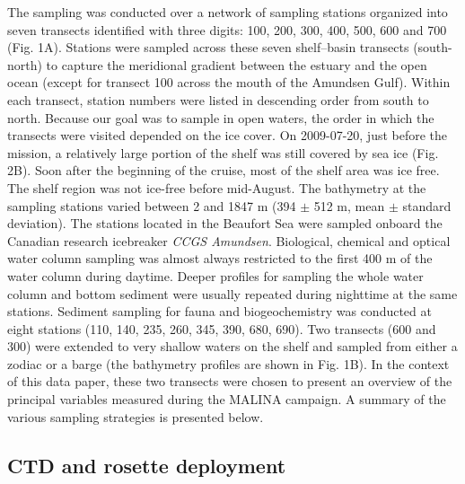 \documentclass[essd, manuscript]{copernicus}
\begin{document}
The sampling was conducted over a network of sampling stations organized into seven transects identified with three digits: 100, 200, 300, 400, 500, 600 and 700 (Fig. 1A). Stations were sampled across these seven shelf–basin transects (south-north) to capture the meridional gradient between the estuary and the open ocean (except for transect 100 across the mouth of the Amundsen Gulf). Within each transect, station numbers were listed in descending order from south to north. Because our goal was to sample in open waters, the order in which the transects were visited depended on the ice cover. On 2009-07-20, just before the mission, a relatively large portion of the shelf was still covered by sea ice (Fig. 2B). Soon after the beginning of the cruise, most of the shelf area was ice free. The shelf region was not ice-free before mid-August. The bathymetry at the sampling stations varied between 2 and 1847 m (394 $\pm$ 512 m, mean $\pm$ standard deviation). The stations located in the Beaufort Sea were sampled onboard the Canadian research icebreaker \textit{CCGS Amundsen}. Biological, chemical and optical water column sampling was almost always restricted to the first 400 m of the water column during daytime. Deeper profiles for sampling the whole water column and bottom sediment were usually repeated during nighttime at the same stations. Sediment sampling for fauna and biogeochemistry was conducted at eight stations (110, 140, 235, 260, 345, 390, 680, 690). Two transects (600 and 300) were extended to very shallow waters on the shelf and sampled from either a zodiac or a barge (the bathymetry profiles are shown in Fig. 1B). In the context of this data paper, these two transects were chosen to present an overview of the principal variables measured during the MALINA campaign. A summary of the various sampling strategies is presented below.

\subsection{CTD and rosette deployment}
\end{document}
